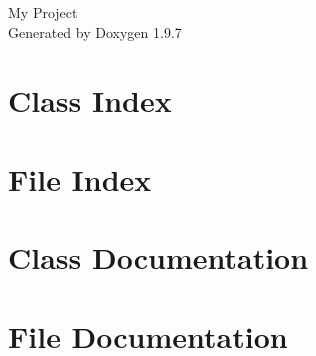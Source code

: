 \documentclass[twoside]{book}
\newcommand{\+}{\discretionary{\mbox{\scriptsize$\hookleftarrow$}}{}{}}
\newcommand{\clearemptydoublepage}{%
    \newpage{\pagestyle{empty}\cleardoublepage}%
  }
\begin{document}
  \raggedbottom
    \hypersetup{pageanchor=false,
                bookmarksnumbered=true,
                pdfencoding=unicode
               }
  \begin{titlepage}
  \vspace*{7cm}
  \begin{center}%
  {\Large My Project}\\
  \vspace*{1cm}
  {\large Generated by Doxygen 1.9.7}\\
  \end{center}
  \end{titlepage}
  \clearemptydoublepage
  \tableofcontents
  \clearemptydoublepage
  \hypersetup{pageanchor=true}
\chapter{Class Index}

\chapter{File Index}

\chapter{Class Documentation}


\chapter{File Documentation}




  \backmatter
  \newpage
  \clearemptydoublepage
  \printindex
\end{document}
